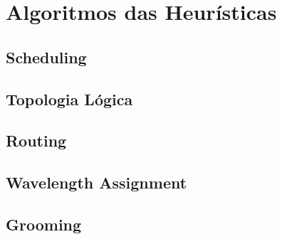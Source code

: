 \chapter{Algoritmos das Heurísticas}
\label{chapter5}

\section{Scheduling}
\label{scheduling2}

\section{Topologia Lógica}
\label{logicaltopology2}

\section{Routing}
\label{routing2}

\section{Wavelength Assignment}
\label{WA}

\section{Grooming}
\label{G}

\cleardoublepage




